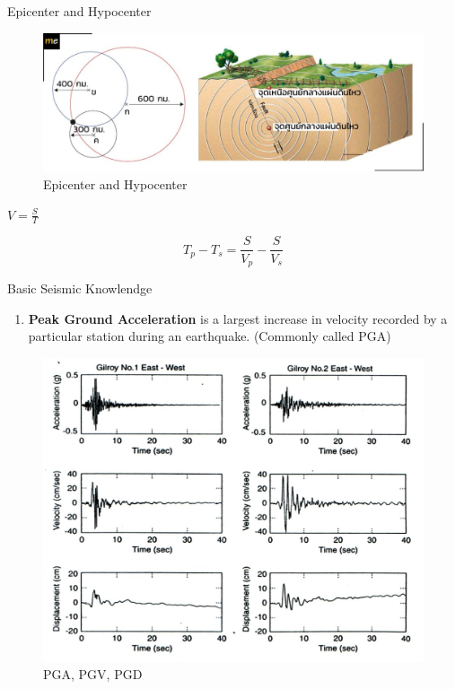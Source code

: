 \documentclass{beamer}
\newcounter{saveenumi}
\newcommand{\seti}{\setcounter{saveenumi}{\value{enumi}}}
\newcommand{\conti}{\setcounter{enumi}{\value{saveenumi}}}
\begin{document}
	\begin{frame}[t]{Epicenter and Hypocenter}
		\begin{figure}
			\centering
			\includegraphics[scale=0.8]{velocity.jpg}
			\caption{Epicenter and Hypocenter}
		\end{figure}
		$V = \frac{S}{T}$
		
		$$T_p - T_s = \frac{S}{V_p} - \frac{S}{V_s}$$
	\end{frame}
	
	
	\begin{frame}[t]{Basic Seismic Knowlendge}
		\begin{enumerate}
			\conti
			\item \textbf{Peak Ground Acceleration} is a largest increase in velocity recorded by a particular station during 
			an earthquake. (Commonly called PGA) 
			\seti
		\end{enumerate}
		
		\begin{figure}
			\centering
			\includegraphics[scale=0.35]{pga.jpg}
			\caption{PGA, PGV, PGD}
		\end{figure}
	\end{frame}
	
\end{document}
